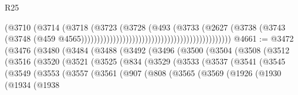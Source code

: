 \begin{lexlean}{R25}
\begin{coremodule}
                                                                          (@3710
                                                                            (@3714
                                                                              (@3718
                                                                                (@3723
                                                                                  (@3728
                                                                                    (@493
                                                                                      (@3733
                                                                                        (@2627
                                                                                          (@3738
                                                                                            (@3743
                                                                                              (@3748
                                                                                                (@459
                                                                                                  @4565)))))))))))))))))))))))))))))))))))))))))))))))
@4661 := @3472
    (@3476
      (@3480
        (@3484
          (@3488
            (@3492
              (@3496
                (@3500
                  (@3504
                    (@3508
                      (@3512
                        (@3516
                          (@3520
                            (@3521
                              (@3525
                                (@834
                                  (@3529
                                    (@3533
                                      (@3537
                                        (@3541
                                          (@3545
                                            (@3549
                                              (@3553
                                                (@3557
                                                  (@3561
                                                    (@907
                                                      (@808
                                                        (@3565
                                                          (@3569
                                                            (@1926
                                                              (@1930
                                                                (@1934
                                                                  (@1938

\end{coremodule}
\end{lexlean}
